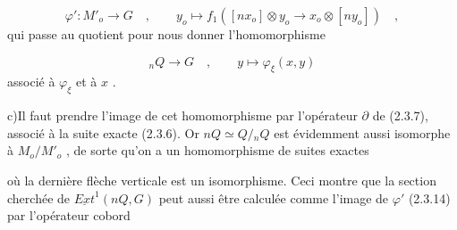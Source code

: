 \begin{equation}\tag{2.3.14}
\varphi' : M'_o \longrightarrow G \quad , \qquad y_o \longmapsto f_1([nx_o] \otimes y_o \to x_o \otimes [ny_o]) \quad ,
\end{equation}
qui passe au quotient pour nous donner l'homomorphisme

\begin{equation*}
{}_nQ \longrightarrow G \quad , \qquad y \longmapsto \varphi_{\xi}(x,y)
\end{equation*}
associé à $\varphi_{\xi}$ et à $x$ .

c)\quad Il faut prendre l'image de cet homomorphisme par l'opérateur $\partial$ de (2.3.7), associé à la suite exacte (2.3.6). Or $nQ \simeq Q/{}_nQ$ est évidemment aussi isomorphe à $M_o/M'_o$ , de sorte qu'on a un homomorphisme de suites exactes 


\begin{center}
\end{center}
 où la dernière flèche verticale est un isomorphisme. Ceci montre que la section cherchée de $\underline{Ext}^1(nQ,G)$ peut aussi être calculée comme l'image de $\varphi'$ (2.3.14) par l'opérateur cobord

